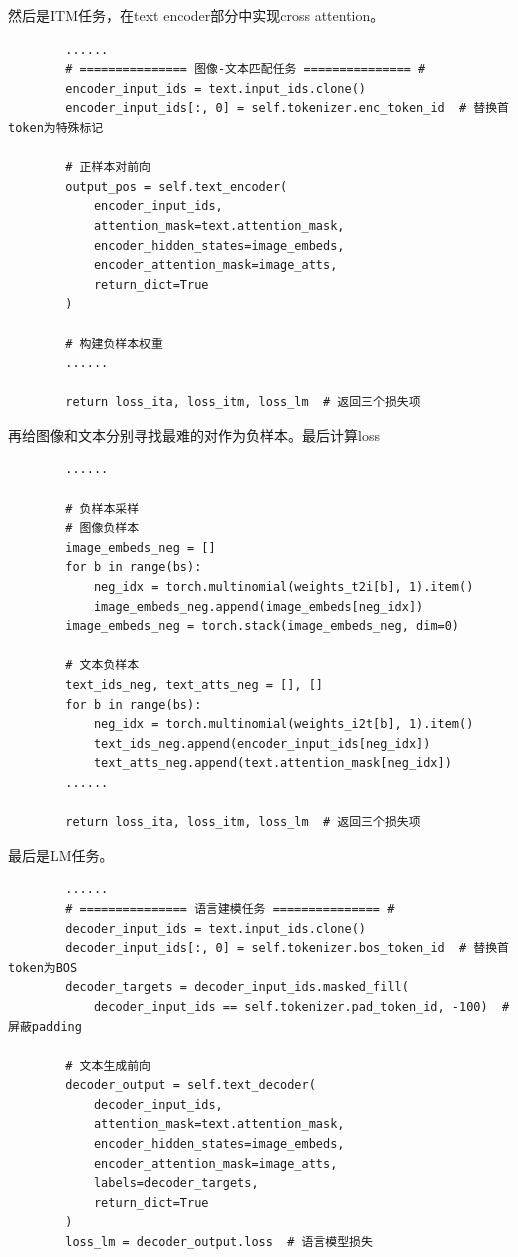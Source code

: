 \documentclass[zihao=false,fontset=windows]{ctexart}
\begin{document}
然后是ITM任务，在text encoder部分中实现cross attention。\par
\begin{feishucode}
\begin{lstlisting}
        ......
        # =============== 图像-文本匹配任务 =============== #
        encoder_input_ids = text.input_ids.clone()
        encoder_input_ids[:, 0] = self.tokenizer.enc_token_id  # 替换首token为特殊标记
        
        # 正样本对前向
        output_pos = self.text_encoder(
            encoder_input_ids,
            attention_mask=text.attention_mask,
            encoder_hidden_states=image_embeds,
            encoder_attention_mask=image_atts,
            return_dict=True
        )
        
        # 构建负样本权重
        ......
        
        return loss_ita, loss_itm, loss_lm  # 返回三个损失项
\end{lstlisting}
\end{feishucode}
再给图像和文本分别寻找最难的对作为负样本。最后计算loss\par
\begin{feishucode}
\begin{lstlisting}
        ......

        # 负样本采样
        # 图像负样本
        image_embeds_neg = []
        for b in range(bs):
            neg_idx = torch.multinomial(weights_t2i[b], 1).item()
            image_embeds_neg.append(image_embeds[neg_idx])
        image_embeds_neg = torch.stack(image_embeds_neg, dim=0)

        # 文本负样本
        text_ids_neg, text_atts_neg = [], []
        for b in range(bs):
            neg_idx = torch.multinomial(weights_i2t[b], 1).item()
            text_ids_neg.append(encoder_input_ids[neg_idx])
            text_atts_neg.append(text.attention_mask[neg_idx])
        ......
        
        return loss_ita, loss_itm, loss_lm  # 返回三个损失项
\end{lstlisting}
\end{feishucode}
最后是LM任务。\par
\begin{feishucode}
\begin{lstlisting}
        ......
        # =============== 语言建模任务 =============== #
        decoder_input_ids = text.input_ids.clone()
        decoder_input_ids[:, 0] = self.tokenizer.bos_token_id  # 替换首token为BOS
        decoder_targets = decoder_input_ids.masked_fill(
            decoder_input_ids == self.tokenizer.pad_token_id, -100)  # 屏蔽padding

        # 文本生成前向
        decoder_output = self.text_decoder(
            decoder_input_ids,
            attention_mask=text.attention_mask,
            encoder_hidden_states=image_embeds,
            encoder_attention_mask=image_atts,
            labels=decoder_targets,
            return_dict=True
        )
        loss_lm = decoder_output.loss  # 语言模型损失
\end{lstlisting}
\end{feishucode}
\end{document}
